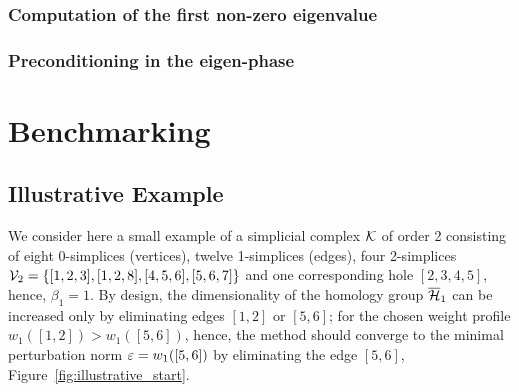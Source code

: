 \subsubsection{ Computation of the first non-zero eigenvalue }

\subsubsection{ Preconditioning in the eigen-phase }







\section{ Benchmarking }

\subsection{Illustrative Example}\label{sec:illustrarive_example}

We consider here a small example 
of a simplicial complex $\mathcal{K}$ of order 2 
consisting of eight 0-simplices (vertices), twelve 1-simplices (edges),  four 2-simplices $\mathcal{V}_2 = \{[1,2,3], [1,2,8], [4,5,6],[5,6,7]\}$   and one corresponding hole $[2,3,4,5]$, hence, $\beta_1 = 1$. By design, the dimensionality of the homology group $\overline{\mathcal{H}}_1$ can be increased only by eliminating edges $[1,2]$ or $[5,6]$; for the chosen weight profile  $w_1([1,2]) > w_1([5,6])$, hence, the method should converge to the minimal perturbation norm $\varepsilon = w_1([5,6])$ by eliminating the edge $[5,6]$, Figure~\ref{fig:illustrative_start}.



